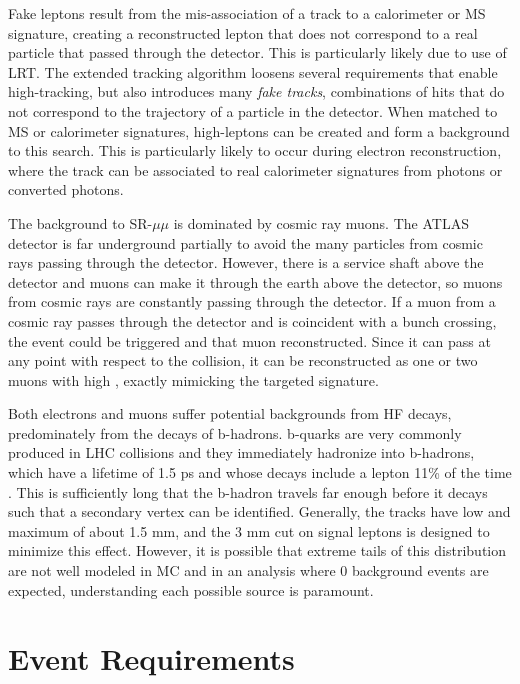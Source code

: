 Fake leptons result from the mis-association of a track to a calorimeter or \ac{MS} signature, creating a reconstructed lepton that does not correspond to a real particle that passed through the detector. 
This is particularly likely due to use of \ac{LRT}. The extended tracking algorithm loosens several requirements that enable high-\absdz tracking, but also introduces many \emph{fake tracks}, combinations of hits that do not correspond to the trajectory of a particle in the detector. When matched to \ac{MS} or calorimeter signatures, high-\absdz leptons can be created and form a background to this search. This is particularly likely to occur during electron reconstruction, where the track can be associated to real calorimeter signatures from photons or converted photons. 

The background to SR-$\mu\mu$ is dominated by cosmic ray muons. The \ac{ATLAS} detector is far underground partially to avoid the many particles from cosmic rays passing through the detector. However, there is a service shaft above the detector and muons can make it through the earth above the detector, so muons from cosmic rays are constantly passing through the detector. If a muon from a cosmic ray passes through the detector and is coincident with a bunch crossing, the event could be triggered and that muon reconstructed. Since it can pass at any point with respect to the collision, it can be reconstructed as one or two muons with high \absdz, exactly mimicking the targeted signature. 

Both electrons and muons suffer potential backgrounds from \ac{HF} decays, predominately from the decays of b-hadrons. b-quarks are very commonly produced in \ac{LHC} collisions and they immediately hadronize into b-hadrons, which have a lifetime of 1.5 ps and whose decays include a lepton 11\% of the time \cite{pdg}. This is sufficiently long that the b-hadron travels far enough before it decays such that a secondary vertex can be identified. Generally, the tracks have low \pt and maximum \absdz of about 1.5 mm, and the 3 mm cut on signal leptons is designed to minimize this effect. However, it is possible that extreme tails of this distribution are not well modeled in \ac{MC} and in an analysis where 0 background events are expected, understanding each possible source is paramount.


\section{Event Requirements}

